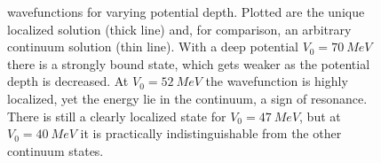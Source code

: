 \documentclass[../main/report.tex]{subfiles}
\begin{document}
\begin{figure}
  \caption{
     wavefunctions for varying potential depth. 
    Plotted are the unique localized solution (thick line) and, for comparison, an arbitrary continuum solution (thin line).
    With a deep potential $V_0 = \SI{70}{MeV}$ there is a strongly bound state, which gets weaker as the potential depth is decreased.
    At $V_0 = \SI{52}{MeV}$ the wavefunction is highly localized, yet the energy lie in the continuum, a sign of resonance.
    There is still a clearly localized state for $V_0 = \SI{47}{MeV}$, but at $V_0 = \SI{40}{MeV}$ it is practically indistinguishable from the other continuum states.
  } 
  \label{fig:wavefunctions}
  \end{figure}

\end{document}
